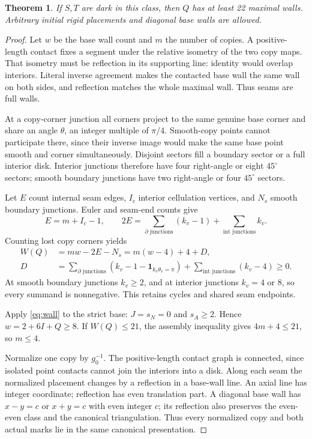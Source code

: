 \documentclass[11pt]{article}
\newtheorem{theorem}{Theorem}[section]
\theoremstyle{definition}
\newcommand{\intr}{\operatorname{int}}
\begin{document}
\begin{theorem}\label{thm:fold}
If $S,T$ are dark in this class, then $Q$ has at least 22 maximal walls. Arbitrary initial rigid placements and diagonal base walls are allowed.
\end{theorem}
\begin{proof}
Let $w$ be the base wall count and $m$ the number of copies. A positive-length contact fixes a segment under the relative isometry of the two copy maps. That isometry must be reflection in its supporting line: identity would overlap interiors. Literal inverse agreement makes the contacted base wall the same wall on both sides, and reflection matches the whole maximal wall. Thus seams are full walls.

At a copy-corner junction all corners project to the same genuine base corner and share an angle $\theta$, an integer multiple of $\pi/4$. Smooth-copy points cannot participate there, since their inverse image would make the same base point smooth and corner simultaneously. Disjoint sectors fill a boundary sector or a full interior disk. Interior junctions therefore have four right-angle or eight $45^\circ$ sectors; smooth boundary junctions have two right-angle or four $45^\circ$ sectors.

Let $E$ count internal seam edges, $I_c$ interior cellulation vertices, and $N_s$ smooth boundary junctions. Euler and seam-end counts give
\[
 E=m+I_c-1,\qquad
 2E=\sum_{\partial\text{ junctions}}(k_v-1)+\sum_{\intr\text{ junctions}}k_v.
\]
Counting lost copy corners yields
\begin{align*}
 W(Q)&=mw-2E-N_s=m(w-4)+4+D,\\
 D&=\sum_{\partial\text{ junctions}}(k_v-1-\mathbf1_{k_v\theta_v=\pi})
       +\sum_{\intr\text{ junctions}}(k_v-4)\ge0.
\end{align*}
At smooth boundary junctions $k_v\ge2$, and at interior junctions $k_v=4$ or $8$, so every summand is nonnegative. This retains cycles and shared seam endpoints.

Apply \eqref{eq:wall} to the strict base: $J=s_N=0$ and $s_A\ge2$. Hence $w=2+6I+Q\ge8$. If $W(Q)\le21$, the assembly inequality gives $4m+4\le21$, so $m\le4$.

Normalize one copy by $g_0^{-1}$. The positive-length contact graph is connected, since isolated point contacts cannot join the interiors into a disk. Along each seam the normalized placement changes by a reflection in a base-wall line. An axial line has integer coordinate; reflection has even translation part. A diagonal base wall has $x-y=c$ or $x+y=c$ with even integer $c$; its reflection also preserves the even-even class and the canonical triangulation. Thus every normalized copy and both actual marks lie in the same canonical presentation.


\end{proof}
\end{document}
